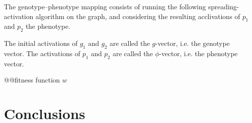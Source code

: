 \documentclass[letterpaper]{article}
\newcommand{\gv}{$g$-vector}
\newcommand{\phv}{$\phi$-vector}
\begin{document}
The genotype--phenotype mapping consists of running the following
spreading-activation algorithm on the graph, and considering the resulting
acclivations of $p_1$ and $p_2$ the phenotype.

The initial activations of $g_1$ and $g_2$ are called the \gv, i.e. the
genotype vector. The activations of $p_1$ and $p_2$ are called the
\phv, i.e. the phenotype vector.

@@fitness function $w$

\section{Conclusions}




\end{document}
